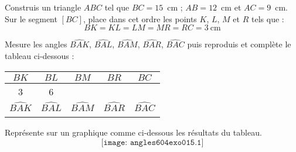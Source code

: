 \begin{myenumerate}
\item Construis un triangle $ABC$ tel que $BC=15$~cm ; $AB=12$~cm et $AC=9$~cm.\\Sur le segment $[BC]$, place dans cet ordre les points $K$, $L$, $M$ et $R$ tels que :
\[BK=KL=LM=MR=RC=3~\mbox{cm}\]
\item Mesure les angles $\widehat{BAK}$, $\widehat{BAL}$, $\widehat{BAM}$, $\widehat{BAR}$, $\widehat{BAC}$ puis reproduis et complète le tableau ci-dessous :
\renewcommand{\arraystretch}{1.5}
  \begin{center}
    \begin{tabular}{|c|c|c|c|c|}
\hline
$BK$&$BL$&$BM$&$BR$&$BC$\\
\hline
3&6&&&\\
\hline
$\widehat{BAK}$&$\widehat{BAL}$&$\widehat{BAM}$&$\widehat{BAR}$&$\widehat{BAC}$\\
\hline
&&&&\\
\hline
    \end{tabular}
  \end{center}
\renewcommand{\arraystretch}{1}
\item Représente sur un graphique comme ci-dessous les résultats du tableau.
\[\texttt{[image: angles604exo015.1]}\]
\end{myenumerate}